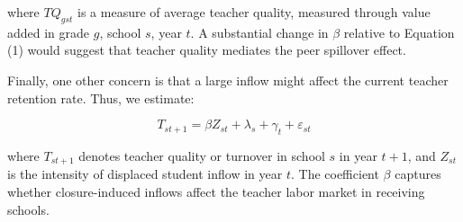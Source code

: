 where $TQ_{gst}$ is a measure of average teacher quality, measured through value added in grade $g$, school $s$, year $t$. A substantial change in $\beta$ relative to Equation (1) would suggest that teacher quality mediates the peer spillover effect.

Finally, one other concern is that a large inflow might affect the current teacher retention rate. Thus, we estimate:

\begin{equation}
T_{st+1} = \beta Z_{st} + \lambda_s + \gamma_t + \varepsilon_{st}
\end{equation}

where $T_{st+1}$ denotes teacher quality or turnover in school $s$ in year $t+1$, and $Z_{st}$ is the intensity of displaced student inflow in year $t$. The coefficient $\beta$ captures whether closure-induced inflows affect the teacher labor market in receiving schools.

